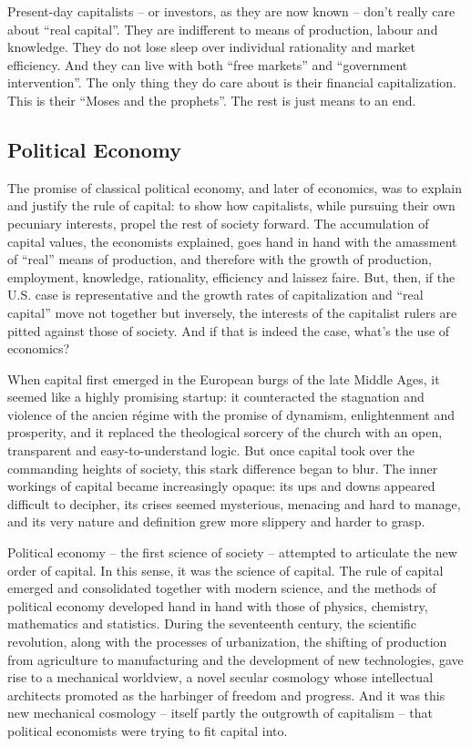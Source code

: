\documentclass[
]{book}
\begin{document}
Present-day capitalists -- or investors, as they are now known -- don't really care about ``real capital''. They are indifferent to means of production, labour and knowledge. They do not lose sleep over individual rationality and market efficiency. And they can live with both ``free markets'' and ``government intervention''. The only thing they do care about is their financial capitalization. This is their ``Moses and the prophets''. The rest is just means to an end.

\hypertarget{political-economy}{%
\subsection{Political Economy}\label{political-economy}}

The promise of classical political economy, and later of economics, was to explain and justify the rule of capital: to show how capitalists, while pursuing their own pecuniary interests, propel the rest of society forward. The accumulation of capital values, the economists explained, goes hand in hand with the amassment of ``real'' means of production, and therefore with the growth of production, employment, knowledge, rationality, efficiency and laissez faire. But, then, if the U.S. case is representative and the growth rates of capitalization and ``real capital'' move not together but inversely, the interests of the capitalist rulers are pitted against those of society. And if that is indeed the case, what's the use of economics?

When capital first emerged in the European burgs of the late Middle Ages, it seemed like a highly promising startup: it counteracted the stagnation and violence of the ancien régime with the promise of dynamism, enlightenment and prosperity, and it replaced the theological sorcery of the church with an open, transparent and easy-to-understand logic. But once capital took over the commanding heights of society, this stark difference began to blur. The inner workings of capital became increasingly opaque: its ups and downs appeared difficult to decipher, its crises seemed mysterious, menacing and hard to manage, and its very nature and definition grew more slippery and harder to grasp.

Political economy -- the first science of society -- attempted to articulate the new order of capital. In this sense, it was the science of capital. The rule of capital emerged and consolidated together with modern science, and the methods of political economy developed hand in hand with those of physics, chemistry, mathematics and statistics. During the seventeenth century, the scientific revolution, along with the processes of urbanization, the shifting of production from agriculture to manufacturing and the development of new technologies, gave rise to a mechanical worldview, a novel secular cosmology whose intellectual architects promoted as the harbinger of freedom and progress. And it was this new mechanical cosmology -- itself partly the outgrowth of capitalism -- that political economists were trying to fit capital into.
\end{document}
